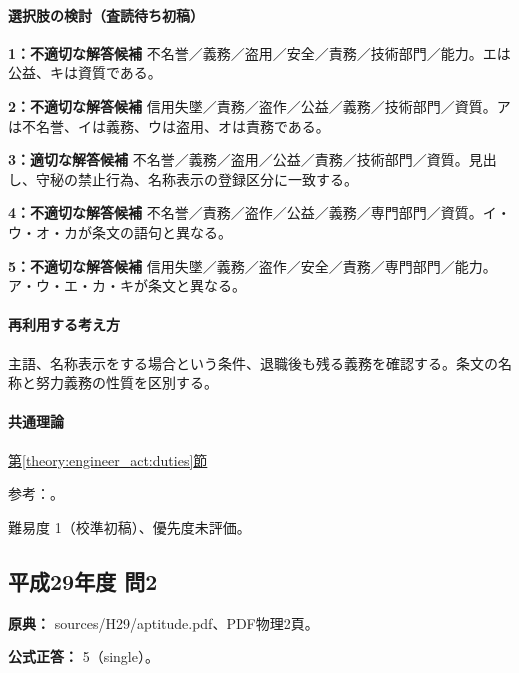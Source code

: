 \paragraph{選択肢の検討（査読待ち初稿）}

\noindent\textbf{1：不適切な解答候補} 不名誉／義務／盗用／安全／責務／技術部門／能力。エは公益、キは資質である。\par

\noindent\textbf{2：不適切な解答候補} 信用失墜／責務／盗作／公益／義務／技術部門／資質。アは不名誉、イは義務、ウは盗用、オは責務である。\par

\noindent\textbf{3：適切な解答候補} 不名誉／義務／盗用／公益／責務／技術部門／資質。見出し、守秘の禁止行為、名称表示の登録区分に一致する。\par

\noindent\textbf{4：不適切な解答候補} 不名誉／責務／盗作／公益／義務／専門部門／資質。イ・ウ・オ・カが条文の語句と異なる。\par

\noindent\textbf{5：不適切な解答候補} 信用失墜／義務／盗作／安全／責務／専門部門／能力。ア・ウ・エ・カ・キが条文と異なる。\par

\paragraph{再利用する考え方} 主語、名称表示をする場合という条件、退職後も残る義務を確認する。条文の名称と努力義務の性質を区別する。

\paragraph{共通理論} \hyperref[theory:engineer_act:duties]{第\ref*{theory:engineer_act:duties}節}

\par 参考：\cite{engineer_act_current}。

\par 難易度 1（校準初稿）、優先度未評価。

\subsection{平成29年度 問2}
\label{q:h29-reg-apt-02}

\noindent\textbf{原典：} sources/H29/aptitude.pdf、PDF物理2頁。

\textbf{公式正答：} 5（single）。

